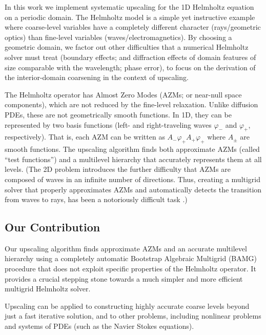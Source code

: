 \documentclass{article}
\begin{document}
In this work we implement systematic upscaling for the 1D Helmholtz equation on a periodic domain. The Helmholtz model is a simple yet instructive example where coarse-level variables have a completely different character (rays/geometric optics) than fine-level variables (waves/electromagnetics). By choosing a geometric domain, we factor out other difficulties that a numerical Helmholtz solver must treat (boundary effects; and diffraction effects of domain features of size comparable with the wavelength; phase error), to focus on the derivation of the interior-domain coarsening in the context of upscaling.

The Helmholtz operator has Almost Zero Modes (AZMs; or near-null space components), which are not reduced by the fine-level relaxation. Unlike diffusion PDEs, these are not geometrically smooth functions. In 1D, they can be represented by two basis functions (left- and right-traveling waves $\varphi_-$ and $\varphi_+$, respectively). That is, each AZM can be written as $A_- \varphi_+ A_+ \varphi_+$ where $A_{\pm}$ are smooth functions. The upscaling algorithm finds both approximate AZMs (called ``test functions'') and a multilevel hierarchy that accurately represents them at all levels. (The 2D problem introduces the further difficulty that AZMs are composed of waves in an infinite number of directions. Thus, creating a multigrid solver that properly approximates AZMs and automatically detects the transition from waves to rays, has been a notoriously difficult task \cite{wave_ray, later_papers}.)

\subsection{Our Contribution}
Our upscaling algorithm finds approximate AZMs and an accurate multilevel hierarchy using a completely automatic Bootstrap Algebraic Multigrid (BAMG) procedure that does not exploit specific properties of the Helmholtz operator. It provides a crucial stepping stone towards a much simpler and more efficient multigrid Helmholtz solver.

Upscaling can be applied to constructing highly accurate coarse levels beyond just a fast iterative solution, and to other problems, including nonlinear problems and systems of PDEs (such as the Navier Stokes equations).
\end{document}
